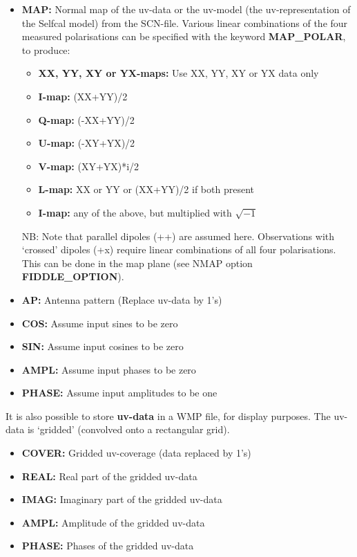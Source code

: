 \begin{itemize}

\item {\bf  MAP:} Normal map of the uv-data or the uv-model (the
uv-representation of the Selfcal model) from the SCN-file.
Various linear combinations of the four measured polarisations can be specified
with the keyword {\bf MAP\_POLAR}, to produce:

  \begin{itemize}
  \item {\bf  XX, YY, XY or YX-maps:} Use XX, YY, XY or YX data only
  \item {\bf  I-map:}   (XX+YY)/2
  \item {\bf  Q-map:}   (-XX+YY)/2
  \item {\bf  U-map:}   (-XY+YX)/2
  \item {\bf  V-map:}   (XY+YX)*i/2
  \item {\bf  L-map:}   XX or YY or (XX+YY)/2 if both present
  \item {\bf  *I-map:}  any of the above, but multiplied with $\sqrt{-1}$
  \end{itemize}

NB: Note that parallel dipoles (++) are assumed here.
Observations with `crossed' dipoles (+x) require linear combinations of
all four polarisations. This can be done in the map plane (see NMAP
option {\bf FIDDLE\_OPTION}).

\item {\bf  AP:}        Antenna pattern (Replace uv-data by 1's)
\item {\bf  COS:}       Assume input sines to be zero
\item {\bf  SIN:}       Assume input cosines to be zero
\item {\bf  AMPL:}      Assume input phases to be zero
\item {\bf  PHASE:}     Assume input amplitudes to be one
\end{itemize}

It is also possible to store {\bf uv-data} in a WMP file, for display purposes.
The uv-data is `gridded' (convolved onto a rectangular grid).

\begin{itemize}
\item {\bf  COVER:}     Gridded uv-coverage (data replaced by 1's)
\item {\bf  REAL:}      Real part of the gridded uv-data
\item {\bf  IMAG:}      Imaginary part of the gridded uv-data
\item {\bf  AMPL:}      Amplitude of the gridded uv-data
\item {\bf  PHASE:}     Phases of the gridded uv-data
\end{itemize}


